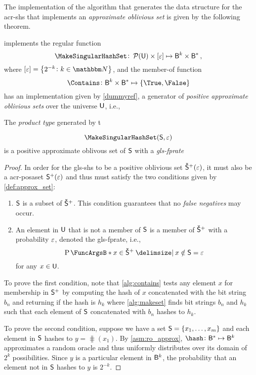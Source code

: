\documentclass[ ../main.tex]{subfiles}
\begin{document}
The implementation of the algorithm that generates the data structure for the 
\gls{acr-shs} that implements an \emph{approximate} \emph{oblivious set} is 
given by the following theorem.
\begin{theorem}
 implements the regular function
\begin{equation}
\MakeSingularHashSet \colon \PowerSet(\Set{U}) \times [\fprate] \mapsto 
\Set{B}^k \times \Set{B}^*\,,
\end{equation}
where $[\fprate] = \left\{2^{-k} \colon k \in \NatSet\right\}$, and the 
member-of function
\begin{equation}
    \Contains \colon \Set{B}^k \times \Set{B}^* \mapsto \{\True,\False\}
\end{equation}
has an implementation given by \cref{dummyref}, a generator of \emph{positive 
approximate 
oblivious sets} over the universe $\Set{U}$, i.e.,


The \emph{product type} generated by t

\begin{equation}
    \MakeSingularHashSet(\Set{S},\fprate)
\end{equation}
is a positive approximate oblivous set of $\Set{S}$ with a 
\emph{\gls{gls-fprate}} 
\end{theorem}
\begin{proof}
In order for the \gls{gls-shs} to be a positive oblivious set $\OPASet{S}(\fprate)$, it must also be a \gls{acr-posaset} $\PASet{S}(\fprate)$ and thus must satisfy the two conditions given by \cref{def:approx_set}:
\begin{enumerate}
    \item $\Set{S}$ is a subset of $\OPASet{S}$. This condition guarantees that 
    no \emph{false negatives} may occur.
    \item An element in $\Set{U}$ that is not a member of $\Set{S}$ is a member 
    of $\OPASet{S}$ with a probability $\varepsilon$, denoted the \gls{gls-fprate}, 
    i.e.,
    \begin{equation}
        \Prob{x \in \OPASet{S} \Given x \notin \Set{S}} = \fprate
    \end{equation}
    for any $x \in \Set{U}$.
\end{enumerate}

To prove the first condition, note that \cref{alg:contains} tests any element $x$ for membership in $\PASet{S}$ by computing the hash of $x$ concatenated with the bit string $b_n$ and returning \True if the hash is $h_k$ where \cref{alg:makeset} finds bit strings $b_n$ and $h_k$ such that each element of $\Set{S}$ concatenated with $b_n$ hashes to $h_k$.

To prove the second condition, suppose we have a set $\Set{S} = \{x_1,\ldots,x_m\}$ and each element in $\Set{S}$ hashes to $y = \hash(x_1)$. By \cref{asm:ro_approx}, $\hash \colon \Set{B}^* \mapsto \Set{B}^k$ approximates a random oracle and thus uniformly distributes over its domain of $2^k$ possibilities. Since $y$ is a particular element in $\Set{B}^k$, the probability that an element not in $\Set{S}$ hashes to $y$ is $2^{-k}$.
\end{proof}
\end{document}
